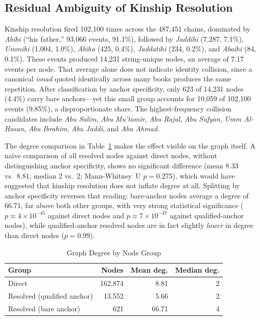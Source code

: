 \documentclass[conference]{IEEEtran}
\begin{document}
\subsection{Residual Ambiguity of Kinship Resolution}

Kinship resolution fired 102{,}100 times across the 487{,}451 chains, dominated by
\textit{Abihi} (``his father,'' 93{,}066 events, 91.1\%), followed by
\textit{Jaddihi} (7{,}287, 7.1\%), \textit{Ummihi} (1{,}004, 1.0\%),
\textit{Abiha} (425, 0.4\%), \textit{Jaddatihi} (234, 0.2\%), and \textit{Abaihi}
(84, 0.1\%). These events produced 14{,}231 string-unique nodes, an average of
7.17 events per node. That average alone does not indicate identity collision,
since a canonical \textit{isnad} quoted identically across many books produces the
same repetition. After classification by anchor specificity, only 623 of 14{,}231
nodes (4.4\%) carry bare anchors---yet this small group accounts for 10{,}059 of
102{,}100 events (9.85\%), a disproportionate share. The highest-frequency
collision candidates include \textit{Abu Salim}, \textit{Abu Mu'tamir},
\textit{Abu Rajul}, \textit{Abu Sufyan}, \textit{Umm Al-Hasan}, \textit{Abu
Ibrahim}, \textit{Abu Jaddi}, and \textit{Abu Ahmad}.

The degree comparison in Table~\ref{tab:kinship} makes the effect visible on the
graph itself. A naive comparison of all resolved nodes against direct nodes,
without distinguishing anchor specificity, shows no significant difference (mean
8.33 vs.\ 8.81; median 2 vs.\ 2; Mann-Whitney~U $p = 0.275$), which would have
suggested that kinship resolution does not inflate degree at all. Splitting by
anchor specificity reverses that reading: bare-anchor nodes average a degree of
66.71, far above both other groups, with very strong statistical significance
($p \approx 4\times10^{-45}$ against direct nodes and $p \approx 7\times10^{-47}$
against qualified-anchor nodes), while qualified-anchor resolved nodes are in fact
slightly \emph{lower} in degree than direct nodes ($p = 0.99$).

\begin{table}[!t]
\caption{Graph Degree by Node Group}
\label{tab:kinship}
\centering
\renewcommand{\arraystretch}{1.3}
\begin{tabular}{lrrr}
\toprule
Group & Nodes & Mean deg. & Median deg. \\
\midrule
Direct                        & 162{,}874 & 8.81  & 2 \\
Resolved (qualified anchor)   & 13{,}552  & 5.66  & 2 \\
Resolved (bare anchor)        & 621       & 66.71 & 4 \\
\bottomrule
\end{tabular}
\end{table}
\end{document}
